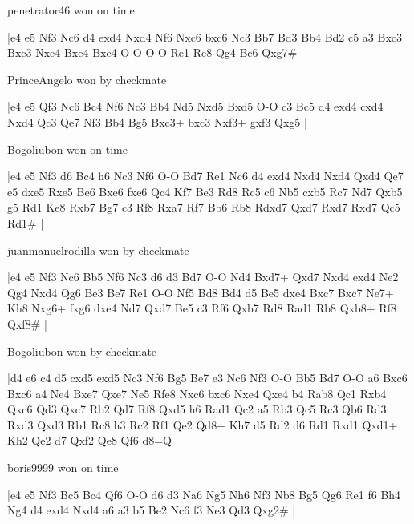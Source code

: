 \showboard

penetrator46 won on time

\makegametitle
|e4 e5 Nf3 Nc6 d4 exd4 Nxd4 Nf6 Nxc6 bxc6 Nc3 Bb7 Bd3 Bb4 Bd2 c5 a3 Bxc3 Bxc3 Nxe4 Bxe4 Bxe4 O-O O-O Re1 Re8 Qg4 Bc6 Qxg7\#  |

\showboard

PrinceAngelo won by checkmate

\makegametitle
|e4 e5 Qf3 Nc6 Bc4 Nf6 Nc3 Bb4 Nd5 Nxd5 Bxd5 O-O c3 Bc5 d4 exd4 cxd4 Nxd4 Qc3 Qe7 Nf3 Bb4 Bg5 Bxc3+ bxc3 Nxf3+ gxf3 Qxg5  |

\showboard

Bogoliubon won on time

\makegametitle
|e4 e5 Nf3 d6 Bc4 h6 Nc3 Nf6 O-O Bd7 Re1 Nc6 d4 exd4 Nxd4 Nxd4 Qxd4 Qe7 e5 dxe5 Rxe5 Be6 Bxe6 fxe6 Qc4 Kf7 Be3 Rd8 Rc5 c6 Nb5 cxb5 Rc7 Nd7 Qxb5 g5 Rd1 Ke8 Rxb7 Bg7 c3 Rf8 Rxa7 Rf7 Bb6 Rb8 Rdxd7 Qxd7 Rxd7 Rxd7 Qc5 Rd1\#  |

\showboard

juanmanuelrodilla won by checkmate

\makegametitle
|e4 e5 Nf3 Nc6 Bb5 Nf6 Nc3 d6 d3 Bd7 O-O Nd4 Bxd7+ Qxd7 Nxd4 exd4 Ne2 Qg4 Nxd4 Qg6 Be3 Be7 Re1 O-O Nf5 Bd8 Bd4 d5 Be5 dxe4 Bxc7 Bxc7 Ne7+ Kh8 Nxg6+ fxg6 dxe4 Nd7 Qxd7 Be5 c3 Rf6 Qxb7 Rd8 Rad1 Rb8 Qxb8+ Rf8 Qxf8\#  |

\showboard

Bogoliubon won by checkmate

\makegametitle
|d4 e6 c4 d5 cxd5 exd5 Nc3 Nf6 Bg5 Be7 e3 Nc6 Nf3 O-O Bb5 Bd7 O-O a6 Bxc6 Bxc6 a4 Ne4 Bxe7 Qxe7 Ne5 Rfe8 Nxc6 bxc6 Nxe4 Qxe4 b4 Rab8 Qc1 Rxb4 Qxc6 Qd3 Qxc7 Rb2 Qd7 Rf8 Qxd5 h6 Rad1 Qc2 a5 Rb3 Qc5 Rc3 Qb6 Rd3 Rxd3 Qxd3 Rb1 Rc8 h3 Rc2 Rf1 Qe2 Qd8+ Kh7 d5 Rd2 d6 Rd1 Rxd1 Qxd1+ Kh2 Qe2 d7 Qxf2 Qe8 Qf6 d8=Q  |

\showboard

boris9999 won on time

\makegametitle
|e4 e5 Nf3 Bc5 Bc4 Qf6 O-O d6 d3 Na6 Ng5 Nh6 Nf3 Nb8 Bg5 Qg6 Re1 f6 Bh4 Ng4 d4 exd4 Nxd4 a6 a3 b5 Be2 Nc6 f3 Ne3 Qd3 Qxg2\#  |

